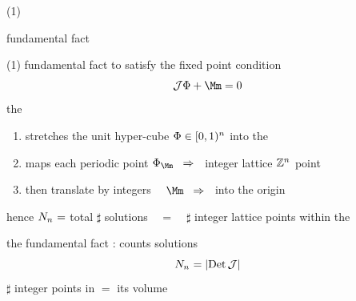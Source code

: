 \begin{frame}{(1)}
\vfill
\begin{center}
{\huge fundamental fact}
\end{center}
\vfill
\end{frame} %

\begin{frame}{(1) fundamental fact}
to satisfy the fixed point condition
\[
\jMorb\Xx+\Mm = 0
\]
the
 {\jacobianOrb} \jMorb\
\begin{enumerate}
              \item
stretches the unit hyper-cube $\Phi\in[0,1)^{n_{}}$ into the \cl{}\dmn\
{\color{blue}\fundPip}
              \item
maps each periodic point ${\Xx}_{\Mm}\;\;\Rightarrow\;\;$ integer lattice
$\mathbb{Z}^{n_{}}$ point
              \item
then translate by integers ~~$\Mm\;\;\Rightarrow\;\;$ into the origin
            \end{enumerate}
hence $N_{n_{}} =$ total $\sharp$ solutions ~~=~~ $\sharp$
integer lattice points within the {\fundPip}

\bigskip

the {\color{blue}fundamental fact} :
{\color{blue}\HillDet} counts solutions
\[
N_{n_{}} = |\mbox{\rm Det}\,{\cal J}|
\] %
$\sharp$ integer points in {\fundPip} $=$ its volume
\end{frame} %

